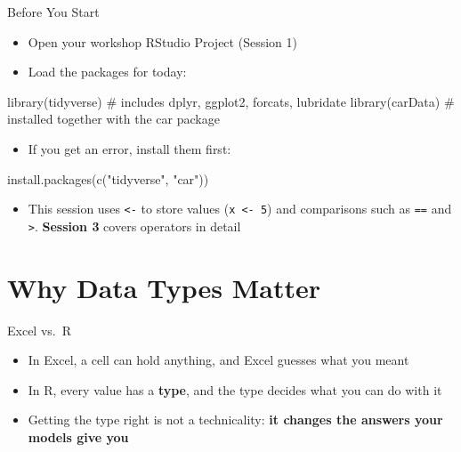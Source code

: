 \documentclass[
  ignorenonframetext,
  aspectratio=169,
]{beamer}
\newenvironment{Shaded}{\begin{snugshade}}{\end{snugshade}}
\newcommand{\CommentTok}[1]{\textcolor[rgb]{0.37,0.37,0.37}{#1}}
\newcommand{\FunctionTok}[1]{\textcolor[rgb]{0.28,0.35,0.67}{#1}}
\newcommand{\NormalTok}[1]{\textcolor[rgb]{0.00,0.23,0.31}{#1}}
\newcommand{\StringTok}[1]{\textcolor[rgb]{0.13,0.47,0.30}{#1}}
\providecommand{\tightlist}{%
  \setlength{\itemsep}{0pt}\setlength{\parskip}{0pt}}\usepackage{longtable,booktabs,array}
\begin{document}
\begin{frame}[fragile]{Before You Start}
\protect\hypertarget{before-you-start}{}
\begin{itemize}
\tightlist
\item
  Open your workshop RStudio Project (Session 1)
\item
  Load the packages for today:
\end{itemize}

\begin{Shaded}
\begin{Highlighting}[]
\FunctionTok{library}\NormalTok{(tidyverse)   }\CommentTok{\# includes dplyr, ggplot2, forcats, lubridate}
\FunctionTok{library}\NormalTok{(carData)     }\CommentTok{\# installed together with the car package}
\end{Highlighting}
\end{Shaded}

\begin{itemize}
\tightlist
\item
  If you get an error, install them first:
\end{itemize}

\begin{Shaded}
\begin{Highlighting}[]
\FunctionTok{install.packages}\NormalTok{(}\FunctionTok{c}\NormalTok{(}\StringTok{"tidyverse"}\NormalTok{, }\StringTok{"car"}\NormalTok{))}
\end{Highlighting}
\end{Shaded}

\begin{itemize}
\tightlist
\item
  This session uses \texttt{\textless{}-} to store values
  (\texttt{x\ \textless{}-\ 5}) and comparisons such as \texttt{==} and
  \texttt{\textgreater{}}. \textbf{Session 3} covers operators in detail
\end{itemize}
\end{frame}

\hypertarget{sec-why}{%
\section{Why Data Types Matter}\label{sec-why}}

\begin{frame}{Excel vs.~R}
\protect\hypertarget{excel-vs.-r}{}
\begin{itemize}
\tightlist
\item
  In Excel, a cell can hold anything, and Excel guesses what you meant
\item
  In R, every value has a \textbf{type}, and the type decides what you
  can do with it
\item
  Getting the type right is not a technicality: \textbf{it changes the
  answers your models give you}
\end{itemize}
\end{frame}
\end{document}
